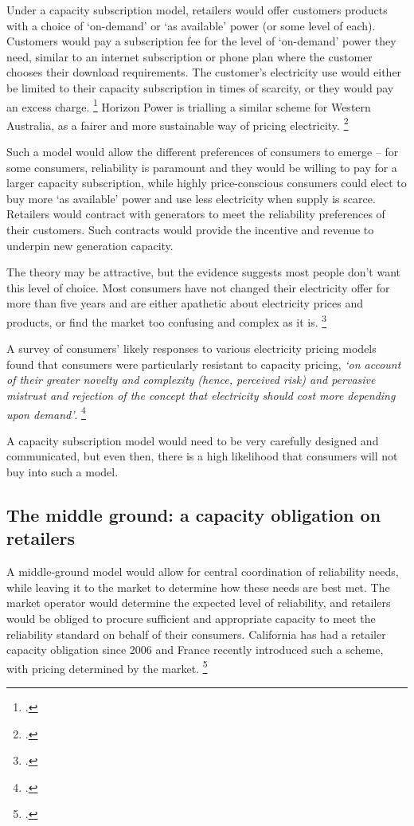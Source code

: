\documentclass[FrontPage]{grattan}
\begin{document}
Under a capacity subscription model, retailers would offer customers products with a choice of `on-demand' or `as available' power (or some level of each). Customers would pay a subscription fee for the level of `on-demand' power they need, similar to an internet subscription or phone plan where the customer chooses their download requirements. The customer's electricity use would either be limited to their capacity subscription in times of scarcity, or they would pay an excess charge.%
\footcite{CIGRE2016CapacityMechanisms}
Horizon Power is trialling a similar scheme for Western Australia, as a fairer and more sustainable way of pricing electricity.%
\footcites{WoodBlowers-2015-Fair-pricing-for-WA}{Horizon2016CostReflectivePilot}

Such a model would allow the different preferences of consumers to emerge -- for some consumers, reliability is paramount and they would be willing to pay for a larger capacity subscription, while highly price-conscious consumers could elect to buy more `as available' power and use less electricity when supply is scarce. Retailers would contract with generators to meet the reliability preferences of their customers. Such contracts would provide the incentive and revenue to underpin new generation capacity.

The theory may be attractive, but the evidence suggests most people don't want this level of choice. Most consumers have not changed their electricity offer for more than five years and are either apathetic about electricity prices and products, or find the market too confusing and complex as it is.%
\footcites{AEMC2016RetailCompReview}{CIGRE2016CapacityMechanisms}

A survey of consumers' likely responses to various electricity pricing models found that consumers were particularly resistant to capacity pricing, \emph{`on account of their greater novelty and complexity (hence, perceived risk) and pervasive mistrust and rejection of the concept that electricity should cost more depending upon demand'}.%
\footcite{CSIRO2015CostReflectivePricing}

A capacity subscription model would need to be very carefully designed and communicated, but even then, there is a high likelihood that consumers will not buy into such a model.


\subsection{The middle ground: a capacity obligation on retailers}\label{subsec:the-middle-ground-a-market-with-central-coordination} 
A middle-ground model would allow for central coordination of reliability needs, while leaving it to the market to determine how these needs are best met. The market operator would determine the expected level of reliability, and retailers would be obliged to procure sufficient and appropriate capacity to meet the reliability standard on behalf of their consumers. California has had a retailer capacity obligation since 2006 and France recently introduced such a scheme, with pricing determined by the market.%
\footcites{CPUC2017ResourceAdequacy}{RTE2017CapacityObligation}
\end{document}
